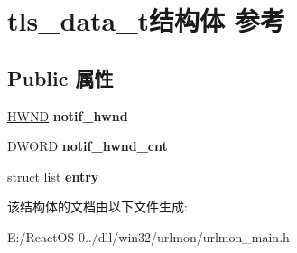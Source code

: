 \hypertarget{structtls__data__t}{}\section{tls\+\_\+data\+\_\+t结构体 参考}
\label{structtls__data__t}
\subsection*{Public 属性}
\begin{DoxyCompactItemize}
\item 
\mbox{\label{structtls__data__t_a30fb9d4d1905ba8512dba11d75875f3b}} 
\hyperlink{interfacevoid}{H\+W\+ND} {\bfseries notif\+\_\+hwnd}
\item 
\mbox{\label{structtls__data__t_aaa6a3d6e8a020c8fddda369926e7ddba}} 
D\+W\+O\+RD {\bfseries notif\+\_\+hwnd\+\_\+cnt}
\item 
\mbox{\label{structtls__data__t_a79820a0b71cf2d20eaa01d51046f67f7}} 
\hyperlink{interfacestruct}{struct} \hyperlink{classlist}{list} {\bfseries entry}
\end{DoxyCompactItemize}


该结构体的文档由以下文件生成\+:\begin{DoxyCompactItemize}
\item 
E\+:/\+React\+O\+S-\/0../dll/win32/urlmon/urlmon\+\_\+main.\+h\end{DoxyCompactItemize}
